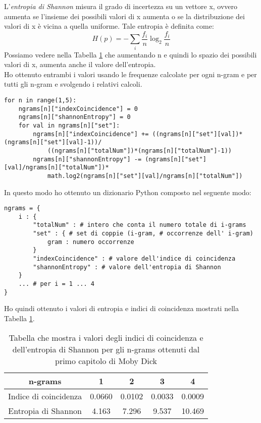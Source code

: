 \documentclass{article}
\begin{document}
L'\textit{entropia di Shannon} misura il grado di incertezza su un vettore x, ovvero aumenta se l'insieme dei possibili valori di x aumenta o se la distribuzione dei valori di x è vicina a quella uniforme. Tale entropia è definita come:
\begin{equation}
H(p) = -\sum_{i}\dfrac{f_i}{n}\log_{2}{\dfrac{f_i}{n}}
\end{equation}
Possiamo vedere nella Tabella \ref{tab:idxFreq} che aumentando n e quindi lo spazio dei possibili valori di x, aumenta anche il valore dell'entropia.\\

Ho ottenuto entrambi i valori usando le frequenze calcolate per ogni n-gram e per tutti gli n-gram e svolgendo i relativi calcoli.
\begin{lstlisting}
for n in range(1,5):
    ngrams[n]["indexCoincidence"] = 0
    ngrams[n]["shannonEntropy"] = 0
    for val in ngrams[n]["set"]:
        ngrams[n]["indexCoincidence"] += ((ngrams[n]["set"][val])*(ngrams[n]["set"][val]-1))/
            ((ngrams[n]["totalNum"])*(ngrams[n]["totalNum"]-1))
        ngrams[n]["shannonEntropy"] -= (ngrams[n]["set"][val]/ngrams[n]["totalNum"])*
            math.log2(ngrams[n]["set"][val]/ngrams[n]["totalNum"])
\end{lstlisting}
In questo modo ho ottenuto un dizionario Python composto nel seguente modo:
\begin{lstlisting}
ngrams = {
    i : {
        "totalNum" : # intero che conta il numero totale di i-grams
        "set" : { # set di coppie (i-gram, # occorrenze dell' i-gram)
            gram : numero occorrenze 
        }
        "indexCoincidence" : # valore dell'indice di coincidenza 
        "shannonEntropy" : # valore dell'entropia di Shannon
    }
    ... # per i = 1 ... 4
}
\end{lstlisting}
Ho quindi ottenuto i valori di entropia e indici di coincidenza mostrati nella Tabella \ref{tab:idxFreq}.
\begin{table}[h]
    \centering
        \begin{tabular}{| c | c | c | c | c |}
         n-grams&1&2&3&4\\\hline
         Indice di coincidenza&0.0660&0.0102&0.0033&0.0009\\ 
         Entropia di Shannon&4.163&7.296&9.537&10.469
        \end{tabular}
         \caption{Tabella che mostra i valori degli indici di coincidenza e dell'entropia di Shannon per gli n-grams ottenuti dal primo capitolo di Moby Dick}
    \label{tab:idxFreq}
\end{table}
\begin{center}

\end{center}
\end{document}
